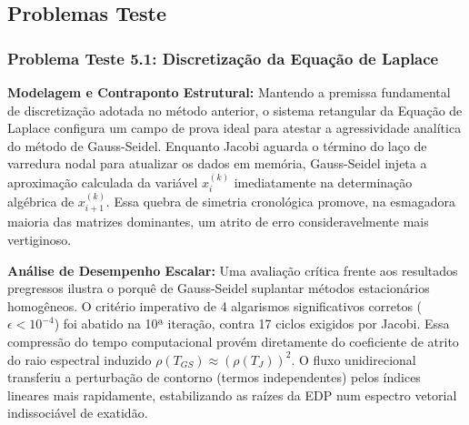 \subsection{Problemas Teste}

\subsubsection{Problema Teste 5.1: Discretização da Equação de Laplace}

\textbf{Modelagem e Contraponto Estrutural:} Mantendo a premissa fundamental de discretização adotada no método anterior, o sistema retangular da Equação de Laplace configura um campo de prova ideal para atestar a agressividade analítica do método de Gauss-Seidel. Enquanto Jacobi aguarda o término do laço de varredura nodal para atualizar os dados em memória, Gauss-Seidel injeta a aproximação calculada da variável $x_i^{(k)}$ imediatamente na determinação algébrica de $x_{i+1}^{(k)}$. Essa quebra de simetria cronológica promove, na esmagadora maioria das matrizes dominantes, um atrito de erro consideravelmente mais vertiginoso.

\begin{table}[H]
\centering
\caption{Histórico de Convergência Acelerada (Problema 5.1 - Gauss-Seidel)}
\label{tab:seidel_prob51}
\end{table}

\textbf{Análise de Desempenho Escalar:} Uma avaliação crítica frente aos resultados pregressos ilustra o porquê de Gauss-Seidel suplantar métodos estacionários homogêneos. O critério imperativo de 4 algarismos significativos corretos ($\epsilon < 10^{-4}$) foi abatido na 10ª iteração, contra 17 ciclos exigidos por Jacobi. Essa compressão do tempo computacional provém diretamente do coeficiente de atrito do raio espectral induzido $\rho(T_{GS}) \approx (\rho(T_J))^2$. O fluxo unidirecional transferiu a perturbação de contorno (termos independentes) pelos índices lineares mais rapidamente, estabilizando as raízes da EDP num espectro vetorial indissociável de exatidão.

